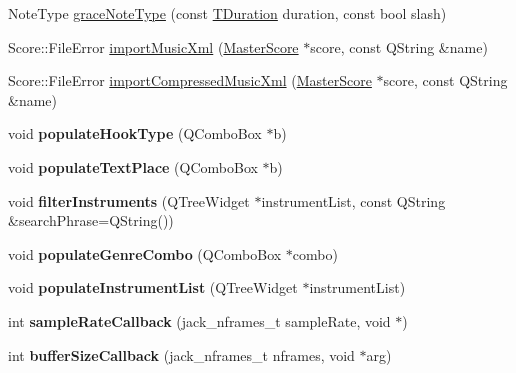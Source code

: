 \begin{DoxyCompactItemize}
\item 
Note\+Type \hyperlink{namespace_ms_a908ed99fa32e69b3a26094a7809abf99}{grace\+Note\+Type} (const \hyperlink{class_ms_1_1_t_duration}{T\+Duration} duration, const bool slash)
\item 
Score\+::\+File\+Error \hyperlink{namespace_ms_a017abe227798d829fe2a344114740ff7}{import\+Music\+Xml} (\hyperlink{class_ms_1_1_master_score}{Master\+Score} $\ast$score, const Q\+String \&name)
\item 
Score\+::\+File\+Error \hyperlink{namespace_ms_a786f5bc8eda1bad75051e33cab434d34}{import\+Compressed\+Music\+Xml} (\hyperlink{class_ms_1_1_master_score}{Master\+Score} $\ast$score, const Q\+String \&name)
\item 
\mbox{\label{namespace_ms_a061206b2b328f62018978aa5a76891b4}} 
void {\bfseries populate\+Hook\+Type} (Q\+Combo\+Box $\ast$b)
\item 
\mbox{\label{namespace_ms_ac5771ba1a52633467cec084c40b68fd8}} 
void {\bfseries populate\+Text\+Place} (Q\+Combo\+Box $\ast$b)
\item 
\mbox{\label{namespace_ms_a0b5f9f17a638fbfa8fb9488532d468c7}} 
void {\bfseries filter\+Instruments} (Q\+Tree\+Widget $\ast$instrument\+List, const Q\+String \&search\+Phrase=Q\+String())
\item 
\mbox{\label{namespace_ms_a29c5d0044b9209d22105355b07fd16da}} 
void {\bfseries populate\+Genre\+Combo} (Q\+Combo\+Box $\ast$combo)
\item 
\mbox{\label{namespace_ms_a4d1aedc90c44474638751820f37cd595}} 
void {\bfseries populate\+Instrument\+List} (Q\+Tree\+Widget $\ast$instrument\+List)
\item 
\mbox{\label{namespace_ms_a6caa2fc8a2183d5d4d49579ea231a939}} 
int {\bfseries sample\+Rate\+Callback} (jack\+\_\+nframes\+\_\+t sample\+Rate, void $\ast$)
\item 
\mbox{\label{namespace_ms_acdda47f0d5198de18d90a260b21af09f}} 
int {\bfseries buffer\+Size\+Callback} (jack\+\_\+nframes\+\_\+t nframes, void $\ast$arg)
\item 
\mbox{\label{namespace_ms_a4f9c0fd2e7f7d8ad1deeb24c8f2b4bf1}} 

\end{DoxyCompactItemize}

